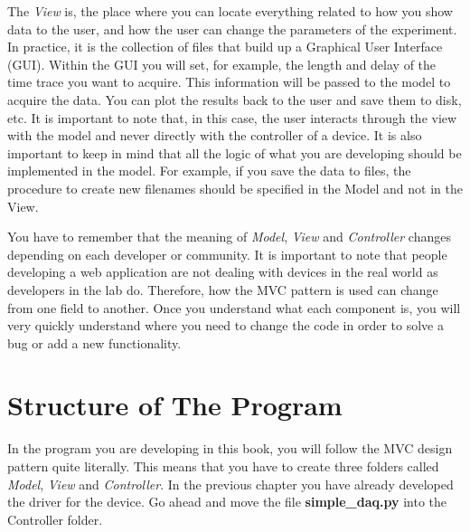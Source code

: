 The \emph{View} is, the place where you can locate everything related to how you show data to the user, and how the user can change the parameters of the experiment. In practice, it is the collection of files that build up a Graphical User Interface ({GUI}). Within the {GUI} you will set, for example, the length and delay of the time trace you want to acquire. This information will be passed to the model to acquire the data. You can plot the results back to the user and save them to disk, etc. It is important to note that, in this case, the user interacts through the view with the model and never directly with the controller of a device. It is also important to keep in mind that all the logic of what you are developing should be implemented in the model. For example, if you save the data to files, the procedure to create new filenames should be specified in the Model and not in the View. 


You have to remember that the meaning of \emph{Model}, \emph{View} and \emph{Controller} changes depending on each developer or community. It
is important to note that people developing a web application are not dealing with devices in the real world as developers in the lab do. Therefore, how the {MVC} pattern is used can change from one field to another. Once you understand what each component is, you will very quickly understand where you need to change the code in order to solve a bug or add a new functionality. 

\section{Structure of The Program}\label{structure-of-theprogram}
In the program you are developing in this book, you will follow the {MVC} design pattern quite literally. This means that you have to create
three folders called \emph{Model}, \emph{View} and \emph{Controller}. In the previous chapter you have already developed the driver for the device. Go ahead and move the file \textbf{simple\_daq.py} into the Controller folder.

